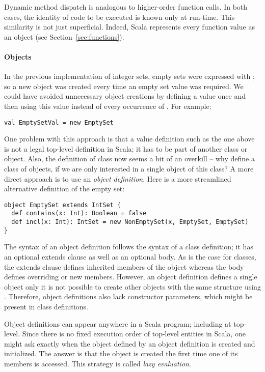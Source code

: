 Dynamic method dispatch is analogous to higher-order function
calls. In both cases, the identity of code to be executed is known
only at run-time. This similarity is not just superficial. Indeed,
Scala represents every function value as an object (see
Section~\ref{sec:functions}).


\paragraph{Objects}

In the previous implementation of integer sets, empty sets were
expressed with ; so a new object was created every time
an empty set value was required. We could have avoided unnecessary
object creations by defining a value  once and then using
this value instead of every occurrence of . For example:
\begin{lstlisting}
val EmptySetVal = new EmptySet
\end{lstlisting}
One problem with this approach is that a value definition such as the
one above is not a legal top-level definition in Scala; it has to be
part of another class or object. Also, the definition of class
 now seems a bit of an overkill -- why define a class of objects, 
if we are only interested in a single object of this class? A more
direct approach is to use an {\em object definition}. Here is
a more streamlined alternative definition of the empty set:
\begin{lstlisting}
object EmptySet extends IntSet {
  def contains(x: Int): Boolean = false
  def incl(x: Int): IntSet = new NonEmptySet(x, EmptySet, EmptySet)
}
\end{lstlisting}
The syntax of an object definition follows the syntax of a class
definition; it has an optional extends clause as well as an optional
body. As is the case for classes, the extends clause defines inherited
members of the object whereas the body defines overriding or new
members.  However, an object definition defines a single object only
it is not possible to create other objects with the same structure
using .  Therefore, object definitions also lack constructor
parameters, which might be present in class definitions.

Object definitions can appear anywhere in a Scala program; including
at top-level.  Since there is no fixed execution order of top-level
entities in Scala, one might ask exactly when the object defined by an
object definition is created and initialized. The answer is that the
object is created the first time one of its members is accessed. This
strategy is called {\em lazy evaluation}.

